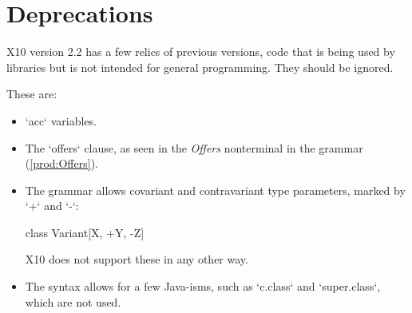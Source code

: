 \chapter{Deprecations}

X10 version 2.2 has a few relics of previous versions, code that is being used
by libraries but is not intended for general programming.    They should be
ignored.

These are: 

\begin{itemize}

\item \xcd`acc` variables. 

\item The \xcd`offers` clause, as seen in the {\it Offers} nonterminal in the
      grammar (\ref{prod:Offers}).

\item The grammar allows covariant and contravariant type parameters, marked
      by \xcd`+` and \xcd`-`: 
\begin{xtenmath}
class Variant[X, +Y, -Z] {}
\end{xtenmath}
      X10 does not support these in any other way.  

\item The syntax allows for a few Java-isms, such as \xcd`c.class` and
      \xcd`super.class`, which are not used.

\end{itemize}
